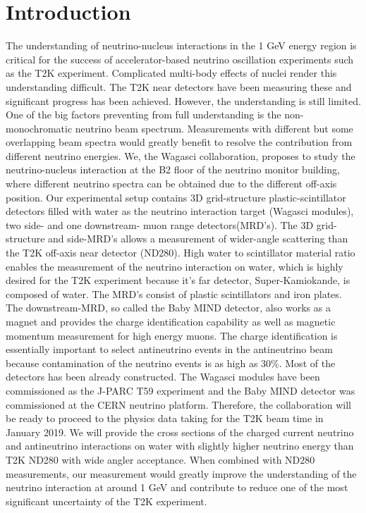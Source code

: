 \section{Introduction}

The understanding of neutrino-nucleus interactions in the 1 GeV energy region is critical for the success
of accelerator-based neutrino oscillation experiments such as the T2K experiment.
Complicated multi-body effects of nuclei render this understanding difficult.
The T2K near detectors have been measuring these and significant progress has been achieved.
However, the understanding is still limited.
One of the big factors preventing from full understanding is the non-monochromatic
neutrino beam spectrum.
Measurements with different but some overlapping beam spectra would greatly benefit to resolve the contribution
from different neutrino energies.
We, the Wagasci collaboration, proposes to study the neutrino-nucleus interaction
at the B2 floor of the neutrino monitor building, where different neutrino spectra
can be obtained due to the different off-axis position.
Our experimental setup contains 3D grid-structure plastic-scintillator detectors filled with water as the neutrino interaction target
(Wagasci modules), two side- and one downstream- muon range detectors(MRD's).
The 3D grid-structure and side-MRD's allows a measurement of  wider-angle scattering than the T2K off-axis near detector (ND280).
High water to scintillator material ratio enables the measurement of the neutrino interaction on water, which
is highly desired for the T2K experiment because it's far detector, Super-Kamiokande, is composed of water.
The MRD's consist of plastic scintillators and iron plates.
The downstream-MRD, so called the Baby MIND detector, also works as a magnet and provides the charge identification capability as well as magnetic momentum measurement for high energy muons.
The charge identification is essentially important to select antineutrino events in the antineutrino beam
because contamination of the neutrino events is as high as 30\%.
Most of the detectors has been already constructed.
The Wagasci modules have been commissioned as the J-PARC T59 experiment and the Baby MIND detector was commissioned at the CERN neutrino platform.
Therefore, the collaboration will be ready to proceed to the physics data taking for the T2K beam time in January 2019.
We will provide the cross sections of the charged current neutrino and antineutrino interactions on water
with slightly higher neutrino energy than T2K ND280 with wide angler acceptance.
When combined with ND280 measurements, our measurement would greatly improve the understanding of the neutrino interaction
at around 1 GeV and contribute to reduce one of the most significant uncertainty of the T2K experiment.
